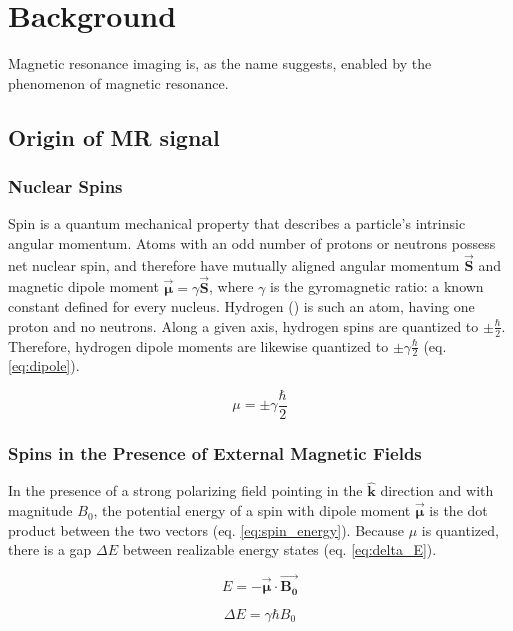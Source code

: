 \newcommand{\uvec}[1]{\bm{\hat{#1}}}
\newcommand{\bvec}[1]{\bm{\vec{#1}}}

\chapter{Background}
Magnetic resonance imaging is, as the name suggests, enabled by the phenomenon of magnetic resonance.

\section{Origin of MR signal}

\subsection{Nuclear Spins}
Spin is a quantum mechanical property that describes a particle's intrinsic angular momentum. Atoms with an odd
number of protons or neutrons possess net nuclear spin, and therefore have mutually aligned angular momentum $\bvec{S}$
and magnetic dipole moment $\bvec{\mu}= \gamma \bvec{S}$, where $\gamma$ is the gyromagnetic ratio: a known constant
defined for every nucleus. Hydrogen () is such an atom, having one proton and no neutrons. Along a given
axis, hydrogen spins are quantized to $\pm \frac{\hbar}2$.  Therefore, hydrogen dipole moments are likewise quantized to
$\pm \gamma \frac{\hbar}{2}$ (eq. \ref{eq:dipole}).

\begin{equation}\label{eq:dipole}
    \mu = \pm \gamma \frac{\hbar}{2}
\end{equation}

\subsection{Spins in the Presence of External Magnetic Fields}
In the presence of a strong polarizing field pointing in the $\uvec{k}$ direction and with magnitude $B_0$, the
potential energy of a spin with dipole moment $\bvec{\mu}$ is the dot product between the two vectors (eq.
\ref{eq:spin_energy}). Because $\mu$ is quantized, there is a gap $\Delta E$ between realizable energy states (eq.
\ref{eq:delta_E}).

\begin{equation}\label{eq:spin_energy}
    E = - \bvec{\mu} \cdot \bvec{B_0}
\end{equation}

\begin{equation}\label{eq:delta_E}
    \Delta E = \gamma \hbar B_0
\end{equation}

